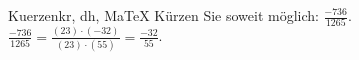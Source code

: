 \begin{MAufgabe}{Kuerzen}{kr, dh, MaTeX}
K\"urzen Sie soweit m\"oglich: $\frac{-736}{1265}$.\\ 
\ifLsg\MLoesung
\quad $\frac{-736}{1265}=\frac{(23)\cdot(-32)}{(23)\cdot(55)}=\frac{-32}{55}$.\else\relax\fi
 \end{MAufgabe}